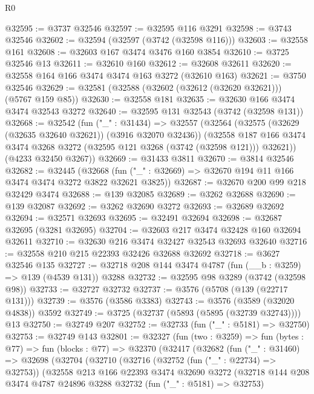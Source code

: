 \begin{lexlean}{R0}
\begin{coremodule}
@32595 := @3737 @32546
@32597 := @32595 @116 @3291
@32598 := @3743 @32546
@32602 := @32594 (@32597 (@3742 (@32598 @116)))
@32603 := @32558 @161
@32608 := @32603 @167 @3474 @3476 @160 @3854
@32610 := @3725 @32546 @13
@32611 := @32610 @160
@32612 := @32608 @32611
@32620 := @32558 @164 @166 @3474 @3474 @163 @3272 (@32610 @163)
@32621 := @3750 @32546
@32629 := @32581 (@32588 (@32602 (@32612 (@32620 @32621))) (@5767 @159 @85))
@32630 := @32558 @181
@32635 := @32630 @166 @3474 @3474 @32543 @3272
@32640 := @32595 @131 @32543 (@3742 (@32598 @131))
@32668 := @32542
    (fun ("_" : @31434) =>
    @32557
      (@32564
        (@32575 (@32629 (@32635 @32640 @32621)) (@3916 @32070 @32436))
        (@32558 @187 @166 @3474 @3474 @3268 @3272 (@32595 @121 @3268 (@3742 (@32598 @121))) @32621))
      (@4233 @32450 @3267))
@32669 := @31433 @3811
@32670 := @3814 @32546
@32682 := @32445
    (@32668 (fun ("_" : @32669) => @32670 @194 @11 @166 @3474 @3474 @3272 @3822 @32621 @3825))
@32687 := @32670 @200 @99 @218 @32429 @3474
@32688 := @139 @32085
@32689 := @3262 @32688
@32690 := @139 @32087
@32692 := @3262 @32690 @3272
@32693 := @32689 @32692
@32694 := @32571 @32693
@32695 := @32491 @32694
@32698 := @32687 @32695 (@3281 @32695)
@32704 := @32603 @217 @3474 @32428 @160 @32694 @32611
@32710 := @32630 @216 @3474 @32427 @32543 @32693 @32640
@32716 := @32558 @210 @215 @22393 @32426 @32688 @32692
@32718 := @3627 @32546 @135
@32727 := @32718 @208 @144 @3474 @4787 (fun (__b : @3259) => @139 (@4539 @131)) @3288
@32732 := @32595 @98 @3289 (@3742 (@32598 @98))
@32733 := @32727 @32732
@32737 := @3576 (@5708 (@139 (@22717 @131)))
@32739 := @3576 (@3586 @3383)
@32743 := @3576 (@3589 (@32020 @4838)) @3592
@32749 := @3725 (@32737 (@5893 (@5895 (@32739 @32743)))) @13
@32750 := @32749 @207
@32752 := @32733 (fun ("_" : @5181) => @32750)
@32753 := @32749 @143
@32801 := @32327
    (fun (two : @3259) =>
    fun (bytes : @77) =>
    fun (blocks : @77) =>
    @32370
      (@32417
        (@32682
          (fun ("_" : @31460) =>
          @32698
            (@32704
              (@32710
                (@32716
                  (@32752 (fun ("_" : @22734) => @32753))
                  (@32558
                    @213
                    @166
                    @22393
                    @3474
                    @32690
                    @3272
                    (@32718
                      @144
                      @208
                      @3474
                      @4787
                      @24896
                      @3288
                      @32732
                      (fun ("_" : @5181) => @32753)

\end{coremodule}
\end{lexlean}
